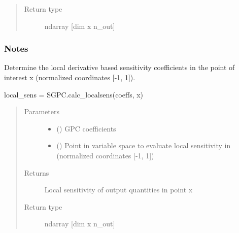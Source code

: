 \documentclass[letterpaper,10pt,english,openany,oneside]{sphinxmanual}
\begin{document}
\begin{fulllineitems}
\begin{fulllineitems}
\begin{quote}
\begin{description}
\item[{Return type}] \leavevmode
ndarray {[}dim x n\_out{]}

\end{description}\end{quote}
\subsubsection*{Notes}

\end{fulllineitems}


\begin{fulllineitems}
\label{\detokenize{pygpc:pygpc.SGPC.SGPC.get_local_sens}}
Determine the local derivative based sensitivity coefficients in the point of interest x
(normalized coordinates {[}-1, 1{]}).

local\_sens = SGPC.calc\_localsens(coeffs, x)
\begin{quote}\begin{description}
\item[{Parameters}] \leavevmode\begin{itemize}
\item {} 
 (\sphinxstyleliteralemphasis{\sphinxupquote{ {[}}}\sphinxstyleliteralemphasis{\sphinxupquote{{]}}}) \textendash{} GPC coefficients

\item {} 
 (\sphinxstyleliteralemphasis{\sphinxupquote{ {[}}}\sphinxstyleliteralemphasis{\sphinxupquote{{]}}}) \textendash{} Point in variable space to evaluate local sensitivity in (normalized coordinates {[}-1, 1{]})

\end{itemize}

\item[{Returns}] \leavevmode
{} \textendash{} Local sensitivity of output quantities in point x

\item[{Return type}] \leavevmode
ndarray {[}dim x n\_out{]}


\end{description}
\end{quote}
\end{fulllineitems}
\end{fulllineitems}
\end{document}
